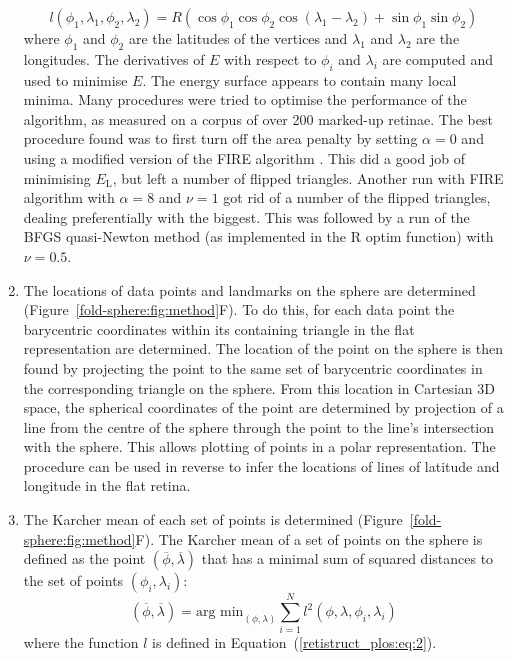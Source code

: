 \documentclass[10pt]{article}
\begin{document}
\begin{enumerate}
  \begin{equation}
    \label{retistruct_plos:eq:2}
    l(\phi_1, \lambda_1, \phi_2, \lambda_2) =
    R(\cos\phi_1\cos\phi_2\cos(\lambda_1-\lambda_2) +
    \sin\phi_1\sin\phi_2)
  \end{equation}
  where $\phi_1$ and $\phi_2$ are the latitudes of the vertices and
  $\lambda_1$ and $\lambda_2$ are the longitudes.  The derivatives of
  $E$ with respect to $\phi_i$ and $\lambda_i$ are computed and used
  to minimise $E$. The energy surface appears to contain many local
  minima. Many procedures were tried to optimise the performance of
  the algorithm, as measured on a corpus of over 200 marked-up
  retinae. The best procedure found was to first turn off the area
  penalty by setting $\alpha=0$ and using a modified version of the
  FIRE algorithm \cite{BitzEtal06stru}. This did a good job of
  minimising $E_\mathrm{L}$, but left a number of flipped
  triangles. Another run with FIRE algorithm with $\alpha=8$ and
  $\nu=1$ got rid of a number of the flipped triangles, dealing
  preferentially with the biggest. This was followed by a run of the
  BFGS quasi-Newton method (as implemented in the R optim function)
  with $\nu=0.5$.
\item The locations of data points and landmarks on the sphere are
  determined (Figure~\ref{fold-sphere:fig:method}F). To do this, for
  each data point the barycentric coordinates within its containing
  triangle in the flat representation are determined.  The location of
  the point on the sphere is then found by projecting the point to the
  same set of barycentric coordinates in the corresponding triangle on
  the sphere. From this location in Cartesian 3D space, the spherical
  coordinates of the point are determined by projection of a line from
  the centre of the sphere through the point to the line's
  intersection with the sphere. This allows plotting of points in a
  polar representation. The procedure can be used in reverse to infer
  the locations of lines of latitude and longitude in the flat retina.
\item The Karcher mean of each set of points is determined
  (Figure~\ref{fold-sphere:fig:method}F). The Karcher mean of a set of
  points on the sphere \cite{Karc77riem,HeoSmal06form} is defined as
  the point $(\overline{\phi}, \overline{\lambda})$ that has a minimal
  sum of squared distances to the set of points $(\phi_i, \lambda_i)$:
  \begin{equation}
    \label{retistruct_plos:eq:3}
    (\overline{\phi}, \overline{\lambda}) = \mbox{arg min}_{(\phi,
      \lambda)} \sum_{i=1}^N l^2(\phi, \lambda, \phi_i, \lambda_i)
  \end{equation}
  where the function $l$ is defined in
  Equation~(\ref{retistruct_plos:eq:2}).
\end{enumerate}
\end{document}
